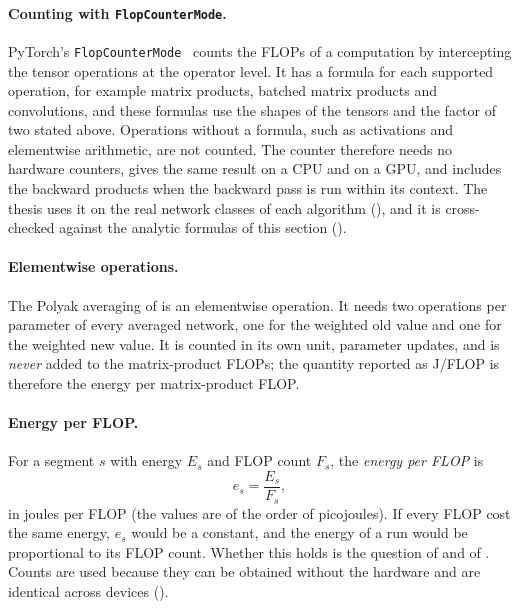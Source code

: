 \paragraph{Counting with \texttt{FlopCounterMode}.} PyTorch's \texttt{FlopCounterMode}~\cite{pytorchflopcounter} counts the FLOPs of a computation by intercepting the tensor operations at the operator level.
It has a formula for each supported operation, for example matrix products, batched matrix products and convolutions, and these formulas use the shapes of the tensors and the factor of two stated above.
Operations without a formula, such as activations and elementwise arithmetic, are not counted.
The counter therefore needs no hardware counters, gives the same result on a CPU and on a GPU, and includes the backward products when the backward pass is run within its context.
The thesis uses it on the real network classes of each algorithm (), and it is cross-checked against the analytic formulas of this section ().

\paragraph{Elementwise operations.} The Polyak averaging of  is an elementwise operation.
It needs two operations per parameter of every averaged network, one for the weighted old value and one for the weighted new value.
It is counted in its own unit, parameter updates, and is \emph{never} added to the matrix-product FLOPs; the quantity reported as J/FLOP is therefore the energy per matrix-product FLOP.

\paragraph{Energy per FLOP.} For a segment $s$ with energy $E_s$ and FLOP count $F_s$, the \emph{energy per FLOP} is
\begin{equation}
  e_s = \frac{E_s}{F_s},
  \label{eq:bg-jpf}
\end{equation}
in joules per FLOP (the values are of the order of picojoules).
If every FLOP cost the same energy, $e_s$ would be a constant, and the energy of a run would be proportional to its FLOP count.
Whether this holds is the question of  and of .
Counts are used because they can be obtained without the hardware and are identical across devices ().

